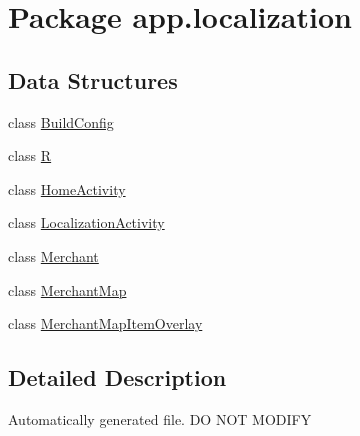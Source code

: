 \hypertarget{namespaceapp_1_1localization}{\section{Package app.\-localization}
\label{namespaceapp_1_1localization}
}
\subsection*{Data Structures}
\begin{DoxyCompactItemize}
\item 
class \hyperlink{classapp_1_1localization_1_1_build_config}{Build\-Config}
\item 
class \hyperlink{classapp_1_1localization_1_1_r}{R}
\item 
class \hyperlink{classapp_1_1localization_1_1_home_activity}{Home\-Activity}
\item 
class \hyperlink{classapp_1_1localization_1_1_localization_activity}{Localization\-Activity}
\item 
class \hyperlink{classapp_1_1localization_1_1_merchant}{Merchant}
\item 
class \hyperlink{classapp_1_1localization_1_1_merchant_map}{Merchant\-Map}
\item 
class \hyperlink{classapp_1_1localization_1_1_merchant_map_item_overlay}{Merchant\-Map\-Item\-Overlay}
\end{DoxyCompactItemize}


\subsection{Detailed Description}
Automatically generated file. D\-O N\-O\-T M\-O\-D\-I\-F\-Y 